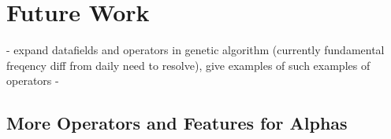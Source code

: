 \documentclass[a4paper,12pt]{report}
\numberwithin{equation}{section}
\theoremstyle{definition}
\begin{document}
\section{Future Work}
- expand datafields and operators in genetic algorithm (currently fundamental freqency diff from daily need to resolve), give examples  of such examples of operators 
- 



\subsection{More Operators and Features for Alphas}





\end{document}
